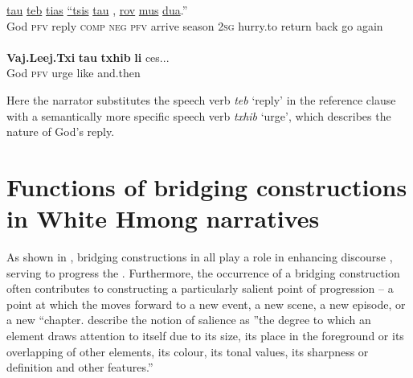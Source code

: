 \documentclass[output=paper]{LSP/langsci}
\begin{document}
\begin{exe}
\ex \label{Jaex:14ab}
\begin{xlist}
\ex \label{Jaex:14a}
\gll  \underline{} \underline{tau} \underline{teb} \underline{tias} \underline{``tsis} \underline{tau}     \underline{} \underline{}, \underline{} \underline{} \underline{rov} \underline{} \underline{mus} \underline{dua}.'' \\
  God \textsc{pfv} reply \textsc{comp} \textsc{neg} \textsc{pfv} arrive season 2\textsc{sg} hurry.to return back go again\\
\glt {}\\
\ex \label{Jaex:14b}
\gll \textbf{Vaj.Leej.Txi} \textbf{tau}  \textbf{txhib} \textbf{li} ces... \\     	      
     God \textsc{pfv} urge like and.then\\
\glt {} \citep[][17]{vang90}
\end{xlist}
\end{exe}

\noindent
Here the narrator substitutes the speech verb \textit{teb} `reply' in the reference clause with a semantically more specific speech verb \textit{txhib} `urge', which describes the nature of God’s reply. 


\section{Functions of bridging constructions in White Hmong narratives} 
\label{JaFunctions}
As shown in , bridging constructions in  all play a role in enhancing discourse , serving to progress the . Furthermore, the occurrence of a bridging construction often contributes to constructing a particularly salient point of progression – a point at which the  moves forward to a new event, a new scene, a new episode, or a new ``chapter. \citet[][210]{kress06} describe the notion of salience as ''the degree to which an element draws attention to itself due to its size, its place in the foreground or its overlapping of other elements, its colour, its tonal values, its sharpness or definition and other features.'' 
\end{document}
